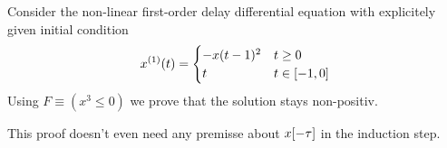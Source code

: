 \documentclass[10pt]{report}
\begin{document}
            Consider the non-linear first-order delay differential equation with explicitely given initial condition
            \begin{equation}
                \D{x}(t) = \begin{cases}
                     -x(t-1)^2 & t \geq 0\\
                     t & t \in [-1,0]
                \end{cases}
            \end{equation}
            Using $F\equiv(x^3\leq 0)$ we prove that the solution stays non-positiv.
            \begin{small}
                \begin{sequentdeduction}
                \end{sequentdeduction}
            \end{small}

            This proof doesn't even need any premisse about $x[-\tau]$ in the induction step.
\end{document}

